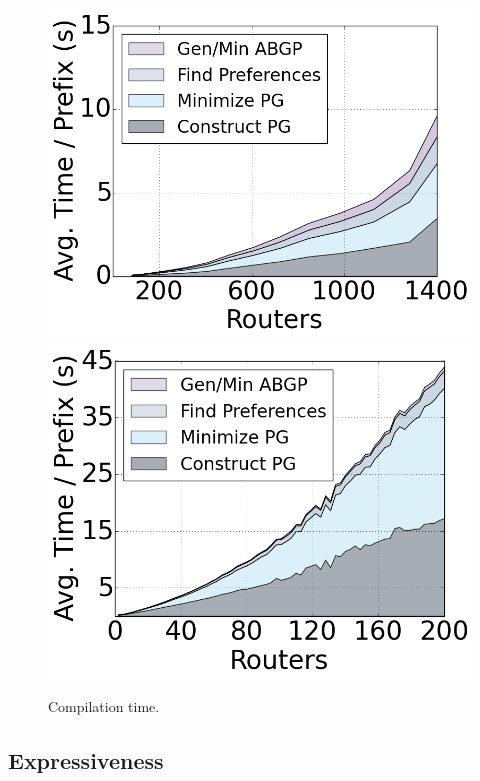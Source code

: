 \documentclass{sig-alternate-10pt}
\providecommand{\DIFaddbegin}{} %
\providecommand{\DIFaddend}{} %
\providecommand{\DIFdelbegin}{} %
\providecommand{\DIFdelend}{} %
\begin{document}
\DIFdelbegin %
\DIFdelend \DIFaddbegin \begin{figure}
    {\includegraphics[width=.49\columnwidth]{figures/compilation-times-dc.png}}
    {\includegraphics[width=.49\columnwidth]{figures/compilation-times-backbone.png}} \\
  \caption{Compilation time. \label{fig:compilation-times}}
  \vspace{-1em}
\end{figure}
\DIFaddend 


\subsection{Expressiveness}
\end{document}
